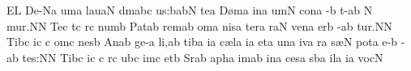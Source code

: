 
\Internote
{}
\initiumgregorianum
{}%
\sgn {}E{}\punctum L\egn
\spatium
\sgn De-\pes Na\egn
\sgn {}um\punctum a\egn
\spatium\sgn lau\clivis aN\egn
\sgn d{\a}m\quilismascandicus abc\egn
\sgn {}u{s:}\clivis ba\augmentumduplex bN\egn
\spatium
\Asteriscus
\divisiominor
\spatium
\sgn te{}\punctum a\egn
\spatium
\sgn D{\o}m\punctum a\egn
\sgn {}in\punctum a\egn
\sgn {}um\punctum N\egn
\spatium
\sgn con\punctum a\egn
{}-\punctum b\egn
\sgn t{\e}-\punctum a\augmentum b\egn
\custos N
\lineaproxima
\sgn mu{r.}\punctum N\augmentum N\egn
\spatium
\divisiofinalis
\spatium
\sgn Te{}\punctum c\egn
\spatium
\sgn {}{\ae}t\punctum c\egn
\sgn {}{\e}r\punctum c\egn
\sgn num\punctum b\egn
\spatium
\sgn Pat\pes ab\egn
\sgn rem\punctum a\augmentum b\egn
\spatium
\divisiominor
\spatium
\sgn {}om\punctum a\egn
\sgn nis\punctum a\egn
\spatium
\sgn ter\punctum a\egn
\sgn ra{}\punctum N\egn
\spatium
\sgn ven\punctum a\egn
\sgn {}er\punctum b\egn
\sgn {}{\a}-\punctum a\augmentum b\egn
\sgn tu{r.}\punctum N\augmentum N\egn
\spatium
\divisiofinalis
\spatium
\sgn Tib\punctum c\egn
\sgn {}i{}\punctum c\egn
\spatium
\custos c
\lineaproxima
\sgn {}om\punctum c\egn
\sgn nes\punctum b\egn
\spatium
\sgn {}An\pes ab\egn
\sgn ge-\punctum a\egn
\sgn li,\punctum a\augmentum b\egn
\spatium
\divisiominor
\spatium
\sgn tib\punctum a\egn
\sgn {}i{}\punctum a\egn
\spatium
\sgn c{\ae}l\punctum a\egn
\sgn {}i{}\punctum a\egn
\spatium
\sgn {}et\punctum a\egn
\spatium
\sgn {}un\punctum a\egn
\sgn {}iv\punctum a\egn
\sgn {}{\e}r\punctum a\egn
\sgn s{\ae}{}\punctum N\egn
\spatium
\sgn pot\punctum a\egn
\sgn {}e-\punctum b\egn
{}-\punctum a\augmentum b\egn
\sgn te{s:}\punctum N\augmentum N\egn
\spatium
\divisiofinalis
\spatium
\sgn Tib\punctum c\egn
\sgn {}i{}\punctum c\egn
\custos c
\lineaproxima
\spatium
{}r\punctum c\egn
\sgn {}ub\punctum c\egn
\sgn {}im\punctum c\egn
\spatium
\sgn {}et\punctum b\egn
\spatium
\sgn S{\e}r\pes ab\egn
\sgn {}a{ph}\punctum a\egn
\sgn {}im\punctum a\augmentum b\egn
\spatium\divisiominor\spatium
\sgn {}in\punctum a\egn
\sgn ces\punctum a\egn
\sgn s{\a}b\punctum a\egn
\sgn {}il\punctum a\egn
\sgn {}i{}\punctum a\egn
\spatium
\sgn voc\punctum N\egn
